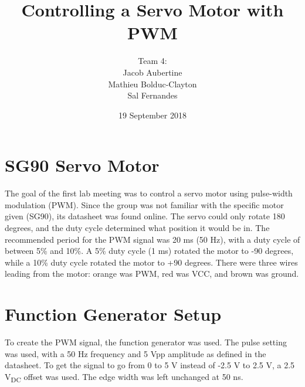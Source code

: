 \documentclass{article}
\title{Controlling a Servo Motor with PWM}
\date{19 September 2018}
\author{
	Team 4:
	\\
	Jacob Aubertine
	\\
	Mathieu Bolduc-Clayton
	\\
	Sal Fernandes
}
\begin{document}
	\maketitle
	\newpage

	\section{SG90 Servo Motor}
	The goal of the first lab meeting was to control a servo motor using pulse-width modulation (PWM). Since the group was not familiar with the specific motor given (SG90), its datasheet was found online. The servo could only rotate 180 degrees, and the duty cycle determined what position it would be in. The recommended period for the PWM signal was 20 ms (50 Hz), with a duty cycle of between 5\% and 10\%. A 5\% duty cycle (1 ms) rotated the motor to -90 degrees, while a 10\% duty cycle rotated the motor to +90 degrees. There were three wires leading from the motor: orange was PWM, red was VCC, and brown was ground.

	\section{Function Generator Setup}
	To create the PWM signal, the function generator was used. The pulse setting was used, with a 50 Hz frequency and 5 Vpp amplitude as defined in the datasheet. To get the signal to go from 0 to 5 V instead of -2.5 V to 2.5 V, a 2.5 V\textsubscript{DC} offset was used. The edge width was left unchanged at 50 ns.
\end{document}
